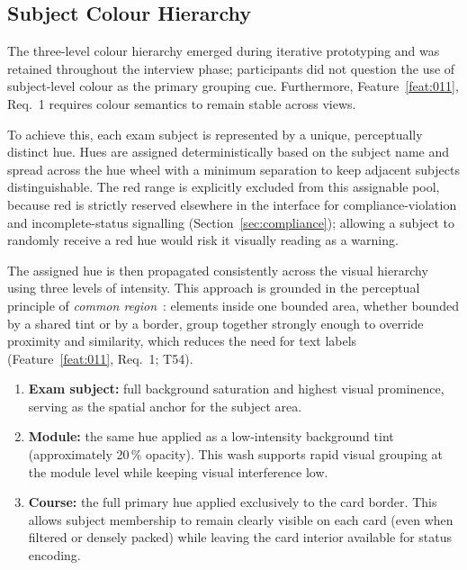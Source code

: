 \subsection{Subject Colour Hierarchy}
\label{sec:subject-colour}
The three-level colour hierarchy emerged during iterative prototyping and was retained throughout the interview phase; participants did not question the use of subject-level colour as the primary grouping cue. Furthermore, Feature~\ref{feat:011}, Req.~1 requires colour semantics to remain stable across views.

To achieve this, each exam subject is represented by a unique, perceptually distinct hue. Hues are assigned deterministically based on the subject name and spread across the hue wheel with a minimum separation to keep adjacent subjects distinguishable. The red range is explicitly excluded from this assignable pool, because red is strictly reserved elsewhere in the interface for compliance-violation and incomplete-status signalling (Section~\ref{sec:compliance}); allowing a subject to randomly receive a red hue would risk it visually reading as a warning.

The assigned hue is then propagated consistently across the visual hierarchy using three levels of intensity. This approach is grounded in the perceptual principle of \emph{common region}~\cite{palmer1992}: elements inside one bounded area, whether bounded by a shared tint or by a border, group together strongly enough to override proximity and similarity, which reduces the need for text labels (Feature~\ref{feat:011}, Req.~1; T54).
\begin{enumerate}
  \item \textbf{Exam subject:} full background saturation and highest visual prominence, serving as the spatial anchor for the subject area.
  \item \textbf{Module:} the same hue applied as a low-intensity background tint (approximately 20\,\% opacity). This wash supports rapid visual grouping at the module level while keeping visual interference low. 
  \item \textbf{Course:} the full primary hue applied exclusively to the card border. This allows subject membership to remain clearly visible on each card (even when filtered or densely packed) while leaving the card interior available for status encoding. 
\end{enumerate}

